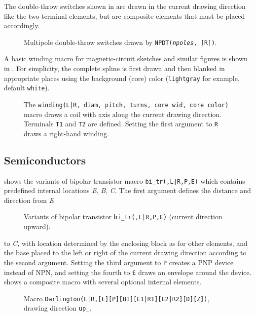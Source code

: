 The double-throw switches shown in  are drawn in the
current drawing direction like the two-terminal elements, but are
composite elements that must be placed accordingly.
\begin{figure}[h!b]
   \ifpdf{\vspace*{-1ex}}\fi%
   
   \caption{Multipole double-throw switches drawn by
    {\tt NPDT({\sl npoles}, [R])}.}
   \label{NPDT}
   \end{figure}

A basic winding macro for magnetic-circuit sketches and similar figures
is shown in .
For simplicity, the complete spline
is first drawn and then blanked in appropriate places using the background
(core) color (\verb!lightgray! for example, default \verb!white!).
\begin{figure}[h!b]
   \vspace*{-\baselineskip}%
   
   \caption{The {\tt winding(L|R, diam, pitch, turns, core wid, core color)}
     macro draws a coil with axis along the current drawing direction.
     Terminals {\tt T1} and {\tt T2} are defined.
     Setting the first argument to {\tt R} draws a right-hand winding.}
   \label{Windings}
   \end{figure}

\subsection{Semiconductors\label{Semiconductors:}}%
 shows the variants of bipolar transistor macro
{\tt bi\_tr(\linespec,L|R,P,E)}
which contains predefined internal locations {\sl E},
{\sl B}, {\sl C}.
The first argument defines the distance and direction from {\sl E}
\begin{figure}[ht]
   
   \caption{Variants of bipolar transistor {\tt bi\_tr(\linespec,L|R,P,E)}
    (current direction upward).}
   \label{Bip}
   \end{figure}
to {\sl C,} with location determined by the enclosing
block as for other elements, and the base placed
to the left or right of the
current drawing direction according to the second argument.  Setting the third
argument to {\tt P} creates a PNP device instead of NPN, and setting the
fourth to {\tt E} draws an envelope around the device.
 shows a composite macro with several optional internal elements.
\begin{figure}[ht]
   
   \caption{Macro {\tt Darlington(L|R,[E][P][B1][E1|R1][E2|R2][D][Z])},
     drawing direction {\tt up\_}.}
   \label{Darlington}
   \end{figure}

